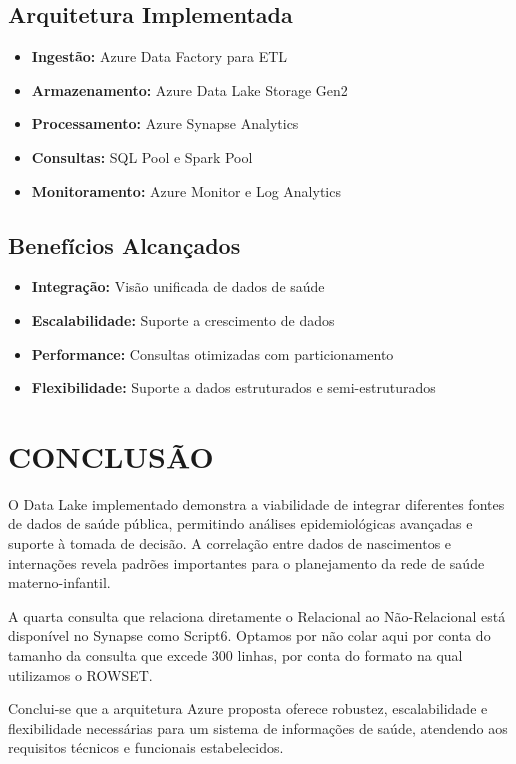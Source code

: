 \documentclass[12pt,a4paper]{article}
\begin{document}
\subsection{Arquitetura Implementada}

\begin{itemize}
    \item \textbf{Ingestão:} Azure Data Factory para ETL
    \item \textbf{Armazenamento:} Azure Data Lake Storage Gen2
    \item \textbf{Processamento:} Azure Synapse Analytics
    \item \textbf{Consultas:} SQL Pool e Spark Pool
    \item \textbf{Monitoramento:} Azure Monitor e Log Analytics
\end{itemize}

\subsection{Benefícios Alcançados}

\begin{itemize}
    \item \textbf{Integração:} Visão unificada de dados de saúde
    \item \textbf{Escalabilidade:} Suporte a crescimento de dados
    \item \textbf{Performance:} Consultas otimizadas com particionamento
    \item \textbf{Flexibilidade:} Suporte a dados estruturados e semi-estruturados
\end{itemize}

\section{CONCLUSÃO}

O Data Lake implementado demonstra a viabilidade de integrar diferentes fontes de dados de saúde pública, permitindo análises epidemiológicas avançadas e suporte à tomada de decisão. A correlação entre dados de nascimentos e internações revela padrões importantes para o planejamento da rede de saúde materno-infantil.

A quarta consulta que relaciona diretamente o Relacional ao Não-Relacional está disponível no Synapse como Script6. Optamos por não colar aqui por conta do tamanho da consulta que excede 300 linhas, por conta do formato na qual utilizamos o ROWSET.

Conclui-se que a arquitetura Azure proposta oferece robustez, escalabilidade e flexibilidade necessárias para um sistema de informações de saúde, atendendo aos requisitos técnicos e funcionais estabelecidos.
\end{document}
